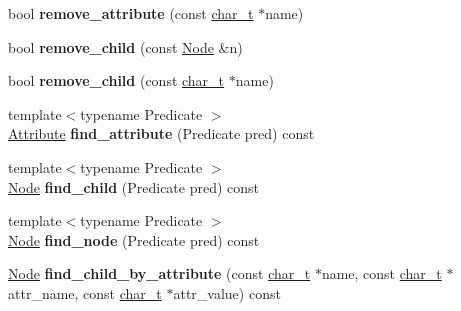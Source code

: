 \begin{DoxyCompactItemize}
\item 
\hypertarget{classphys_1_1xml_1_1Node_a070ffe875695188e68f0554cd2efc2a9}{
bool {\bfseries remove\_\-attribute} (const \hyperlink{namespacephys_1_1xml_afc87705cd1c2917d87b879715a2d8f6e}{char\_\-t} $\ast$name)}
\label{d7/d0a/classphys_1_1xml_1_1Node_a070ffe875695188e68f0554cd2efc2a9}

\item 
\hypertarget{classphys_1_1xml_1_1Node_a2cf35b26227f6067a25a2ae1647e8f31}{
bool {\bfseries remove\_\-child} (const \hyperlink{classphys_1_1xml_1_1Node}{Node} \&n)}
\label{d7/d0a/classphys_1_1xml_1_1Node_a2cf35b26227f6067a25a2ae1647e8f31}

\item 
\hypertarget{classphys_1_1xml_1_1Node_ab10af5783c31fb58cc533b58a3c11ae0}{
bool {\bfseries remove\_\-child} (const \hyperlink{namespacephys_1_1xml_afc87705cd1c2917d87b879715a2d8f6e}{char\_\-t} $\ast$name)}
\label{d7/d0a/classphys_1_1xml_1_1Node_ab10af5783c31fb58cc533b58a3c11ae0}

\item 
\hypertarget{classphys_1_1xml_1_1Node_a59e43a51c83065e02fea2f39a37d84f0}{
{\footnotesize template$<$typename Predicate $>$ }\\\hyperlink{classphys_1_1xml_1_1Attribute}{Attribute} {\bfseries find\_\-attribute} (Predicate pred) const }
\label{d7/d0a/classphys_1_1xml_1_1Node_a59e43a51c83065e02fea2f39a37d84f0}

\item 
\hypertarget{classphys_1_1xml_1_1Node_aa46f1a55d5fead8ea4cc68235e45f3fc}{
{\footnotesize template$<$typename Predicate $>$ }\\\hyperlink{classphys_1_1xml_1_1Node}{Node} {\bfseries find\_\-child} (Predicate pred) const }
\label{d7/d0a/classphys_1_1xml_1_1Node_aa46f1a55d5fead8ea4cc68235e45f3fc}

\item 
\hypertarget{classphys_1_1xml_1_1Node_af755f4925f6839e0f8a768cfc3b265d4}{
{\footnotesize template$<$typename Predicate $>$ }\\\hyperlink{classphys_1_1xml_1_1Node}{Node} {\bfseries find\_\-node} (Predicate pred) const }
\label{d7/d0a/classphys_1_1xml_1_1Node_af755f4925f6839e0f8a768cfc3b265d4}

\item 
\hypertarget{classphys_1_1xml_1_1Node_ad877293c5bfd97ea7f4e6319db816ac4}{
\hyperlink{classphys_1_1xml_1_1Node}{Node} {\bfseries find\_\-child\_\-by\_\-attribute} (const \hyperlink{namespacephys_1_1xml_afc87705cd1c2917d87b879715a2d8f6e}{char\_\-t} $\ast$name, const \hyperlink{namespacephys_1_1xml_afc87705cd1c2917d87b879715a2d8f6e}{char\_\-t} $\ast$attr\_\-name, const \hyperlink{namespacephys_1_1xml_afc87705cd1c2917d87b879715a2d8f6e}{char\_\-t} $\ast$attr\_\-value) const }
\label{d7/d0a/classphys_1_1xml_1_1Node_ad877293c5bfd97ea7f4e6319db816ac4}


\end{DoxyCompactItemize}
